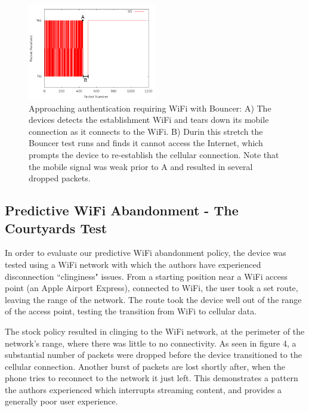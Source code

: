 \begin{figure}
	\includegraphics[width=0.5\textwidth]{paneraWithPolicy}
	\caption{Approaching authentication requiring WiFi with Bouncer: A) The devices detects the establishment WiFi and tears down its mobile connection as it connects to the WiFi. B) Durin this stretch the Bouncer test runs and finds it cannot access the Internet, which prompts the device to re-establish the cellular connection. Note that the mobile signal was weak prior to A and resulted in several dropped packets.}
\end{figure}

\subsection{Predictive WiFi Abandonment - The Courtyards Test}
In order to evaluate our predictive WiFi abandonment policy, the device was tested using a WiFi network with which the authors have experienced disconnection ``clinginess" issues. From a starting position near a WiFi access point (an Apple Airport Express), connected to WiFi, the user took a set route, leaving the range of the network. The route took the device well out of the range of the access point, testing the transition from WiFi to cellular data.

The stock policy resulted in clinging to the WiFi network, at the perimeter of the network's range, where there was little to no connectivity. As seen in figure 4, a substantial number of packets were dropped before the device transitioned to the cellular connection. Another burst of packets are lost shortly after, when the phone tries to reconnect to the network it just left. This demonstrates a pattern the authors experienced which interrupts streaming content, and provides a generally poor user experience.

